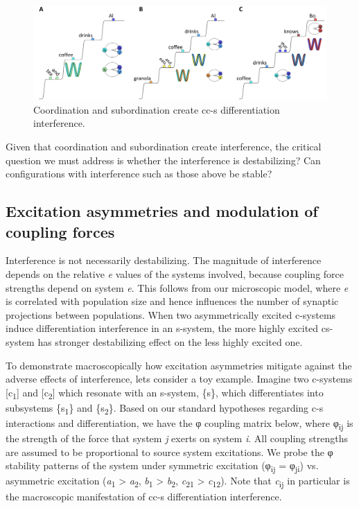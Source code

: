   
\begin{figure}
\includegraphics[width=\textwidth]{figures/Tilsen-img94.png}
\caption{Coordination and subordination create cc-s differentiation interference.}
\label{fig:4:44}
\end{figure}
 

  Given that coordination and subordination create interference, the critical question we must address is whether the interference is destabilizing? Can configurations with interference such as those above be stable? 

\subsection{Excitation asymmetries and modulation of coupling forces}

Interference is not necessarily destabilizing. The magnitude of interference depends on the relative \textit{e} values of the systems involved, because coupling force strengths depend on system \textit{e}. This follows from our microscopic model, where \textit{e} is correlated with population size and hence influences the number of synaptic projections between populations. When two asymmetrically excited c-systems induce differentiation interference in an s-system, the more highly excited cs-system has stronger destabilizing effect on the less highly excited one.

  To demonstrate macroscopically how excitation asymmetries mitigate against the adverse effects of interference, lets consider a toy example. Imagine two c-systems [c\textsubscript{1}] and [c\textsubscript{2}] which resonate with an s-system, \{s\}, which differentiates into subsystems \{s\textsubscript{1}\} and \{s\textsubscript{2}\}. Based on our standard hypotheses regarding c-s interactions and differentiation, we have the φ coupling matrix below, where φ\textsubscript{ij} is the strength of the force that system \textit{j} exerts on system \textit{i}. All coupling strengths are assumed to be proportional to source system excitations. We probe the φ stability patterns of the system under symmetric excitation (φ\textsubscript{ij} = φ\textsubscript{ji}) vs. asymmetric excitation (\textit{a}\textsubscript{1} > \textit{a}\textsubscript{2}, \textit{b}\textsubscript{1} > \textit{b}\textsubscript{2}, \textit{c}\textsubscript{21} > \textit{c}\textsubscript{12}). Note that \textit{c}\textsubscript{ij} in particular is the macroscopic manifestation of cc-s differentiation interference.

